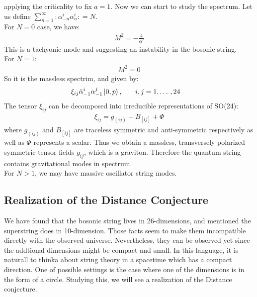 applying the criticality to fix $a=1$. Now we can start to study the spectrum. Let us define $\sum_{n=1} ^{\infty} :\alpha _{-n}^{i} \alpha_{n}^{i}: = N$. \\
For $N=0$ case, we have:
\begin{align}
    M^{2}= -\frac{4}{\alpha'}
\end{align}
This is a tachyonic mode and suggesting an instability in the bosonic string. \\
For $N= 1$:
\begin{align}
    M^{2}=0
\end{align}
So it is the massless spectrim, and given by:
\begin{align}
    \xi _{ij} \tilde{\alpha}_{-1}^{i} \alpha_{-1}^{j} \ket{0,p}, & \qq{} i,j=1.\dotso ,24
\end{align} 
The tensor $\xi_{ij}$ can be decomposed into irreducible representations of SO(24):
\begin{align}
    \xi _{ij} = g_{(ij)} + B_{[ij]} + \Phi
\end{align}
where $g_{(ij)}$ and $B_{[ij]}$ are traceless symmetric and anti-symmetric respectively as well as $\Phi$ represents a scalar. Thus we obtain a massless, transversely polarized symmetric tensor fields $g_{ij}$, which is a graviton. Therefore the quantum string contains gravitational modes in spectrum. \\
For $N>1$, we may have massive oscillator string modes.

\subsection{Realization of the Distance Conjecture}
We have found that the bosonic string lives in 26-dimensions, and mentioned the superstring does in 10-dimension. Those facts seem to make them incompatible directly with the observed universe. Nevertheless, they can be observed yet since the addtional dimensions might be compact and small. In this language, it is naturall to thinka about string theory in a spacetime which has a compact direction. One of possible settings is the case where one of the dimensions is in the form of a circle. Studying this, we will see a realization of the Distance conjecture.

